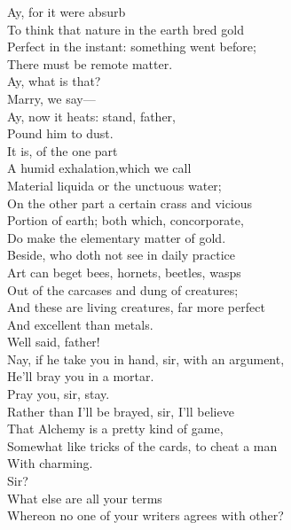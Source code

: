 \documentclass[a4paper,oneside,12pt]{memoir}
\begin{document}
\begin{drama*}
\subtlespeaks {} Ay, for it were absurb\\
To think that nature in the earth bred gold\\
Perfect in the instant: something went before;\\
There must be remote matter.\\
\surlyspeaks {} Ay, what is that?\\
\subtlespeaks Marry, we say---\\
\mammonspeaks {} Ay, now it heats: stand, father,\\
Pound him to dust.\\
\subtlespeaks {} It is, of the one part\\
A humid exhalation,which we call\\
Material liquida or the unctuous water;\\
On the other part a certain crass and vicious\\
Portion of earth; both which, concorporate,\\
Do make the elementary matter of gold.\\
Beside, who doth not see in daily practice\\
Art can beget bees, hornets, beetles, wasps\\
Out of the carcases and dung of creatures;\\
And these are living creatures, far more perfect\\
And excellent than metals.\\
\mammonspeaks {} Well said, father!\\
Nay, if he take you in hand, sir, with an argument,\\
He'll bray you in a mortar.\\
\surlyspeaks {} Pray you, sir, stay.\\
Rather than I'll be brayed, sir, I'll believe\\
That Alchemy is a pretty kind of game,\\
Somewhat like tricks of the cards, to cheat a man\\
With charming.\\
\subtlespeaks {} Sir?\\
\surlyspeaks {} What else are all your terms\\
Whereon no one of your writers agrees with other?\\

\end{drama*}
\end{document}
